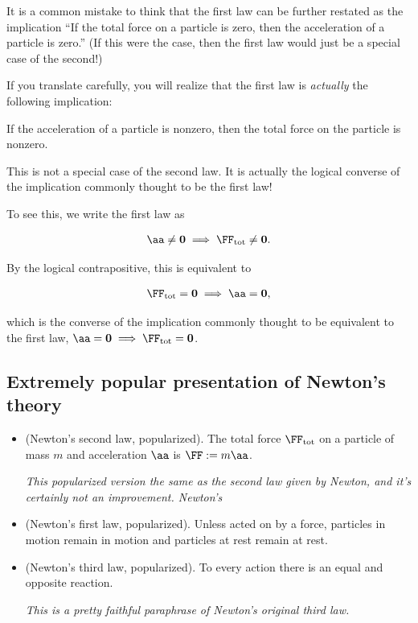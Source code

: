 \documentclass{article}
\begin{document}
It is a common mistake to think that the first law can be further restated as the implication ``If the total force on a particle is zero, then the acceleration of a particle is zero.'' (If this were the case, then the first law would just be a special case of the second!)

If you translate carefully, you will realize that the first law is \textit{actually} the following implication:

\begin{center}
	If the acceleration of a particle is nonzero, then the total force on the particle is nonzero.
\end{center}

This is not a special case of the second law. It is actually the logical converse of the implication commonly thought to be the first law!

To see this, we write the first law as

\begin{align*}
	\aa \neq \mathbf{0} \implies \FF_{\text{tot}} \neq \mathbf{0}.
\end{align*}

By the logical contrapositive, this is equivalent to

\begin{align*}
	\FF_{\text{tot}} = \mathbf{0} \implies \aa = \mathbf{0},
\end{align*}

which is the converse of the implication commonly thought to be equivalent to the first law, $\aa = \mathbf{0} \implies \FF_{\text{tot}} = \mathbf{0}$.

\subsection*{Extremely popular presentation of Newton's theory}

\begin{itemize}
	\item (Newton's second law, popularized). The total force $\FF_{\text{tot}}$ on a particle of mass $m$ and acceleration $\aa$ is $\FF := m\aa$.
	
	\textit{This popularized version the same as the second law given by Newton, and it's certainly not an improvement. Newton's }
	
	\item (Newton's first law, popularized). Unless acted on by a force, particles in motion remain in motion and particles at rest remain at rest.
	
	
	\item (Newton's third law, popularized). To every action there is an equal and opposite reaction.
	
	\textit{This is a pretty faithful paraphrase of Newton's original third law.}
\end{itemize}
\end{document}
